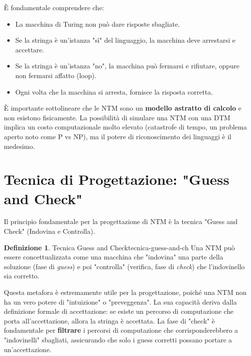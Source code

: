 \documentclass[a4paper]{article}
\theoremstyle{definition} %
\newtheorem{definition}{Definizione}[section]
\begin{document}
È fondamentale comprendere che:
\begin{itemize}
    \item La macchina di Turing non può dare risposte sbagliate.
    \item Se la stringa è un'istanza "sì" del linguaggio, la macchina deve arrestarsi e accettare.
    \item Se la stringa è un'istanza "no", la macchina può fermarsi e rifiutare, oppure non fermarsi affatto (loop).
    \item Ogni volta che la macchina si arresta, fornisce la risposta corretta.
\end{itemize}

È importante sottolineare che le NTM sono un \textbf{modello astratto di calcolo} e non esistono fisicamente. La possibilità di simulare una NTM con una DTM implica un costo computazionale molto elevato (catastrofe di tempo, un problema aperto noto come P vs NP), ma il potere di riconoscimento dei linguaggi è il medesimo.

\section{Tecnica di Progettazione: "Guess and Check"}

Il principio fondamentale per la progettazione di NTM è la tecnica "Guess and Check" (Indovina e Controlla).

\begin{definition}{Tecnica Guess and Check}{tecnica-guess-and-ch}
Una NTM può essere concettualizzata come una macchina che "indovina" una parte della soluzione (fase di \emph{guess}) e poi "controlla" (verifica, fase di \emph{check}) che l'indovinello sia corretto.
\end{definition}

Questa metafora è estremamente utile per la progettazione, poiché una NTM non ha un vero potere di "intuizione" o "preveggenza". La sua capacità deriva dalla definizione formale di accettazione: se esiste un percorso di computazione che porta all'accettazione, allora la stringa è accettata. La fase di "check" è fondamentale per \textbf{filtrare} i percorsi di computazione che corrisponderebbero a "indovinelli" sbagliati, assicurando che solo i guess corretti possano portare a un'accettazione.
\end{document}
